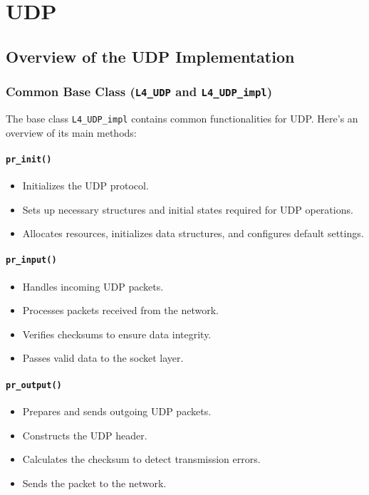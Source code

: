 \chapter{UDP}

\section{Overview of the UDP Implementation}

\subsection{Common Base Class (\texttt{L4\_UDP} and \texttt{L4\_UDP\_impl})}
The base class \texttt{L4\_UDP\_impl} contains common functionalities for UDP. Here's an overview of its main methods:

\subsubsection{\texttt{\large pr\_init()}}
\begin{itemize}
    \item Initializes the UDP protocol.
    \item Sets up necessary structures and initial states required for UDP operations.
    \item Allocates resources, initializes data structures, and configures default settings.
\end{itemize}

\subsubsection{\texttt{\large pr\_input()}}
\begin{itemize}
    \item Handles incoming UDP packets.
    \item Processes packets received from the network.
    \item Verifies checksums to ensure data integrity.
    \item Passes valid data to the socket layer.
\end{itemize}

\subsubsection{\texttt{\large pr\_output()}}
\begin{itemize}
    \item Prepares and sends outgoing UDP packets.
    \item Constructs the UDP header.
    \item Calculates the checksum to detect transmission errors.
    \item Sends the packet to the network.
\end{itemize}

